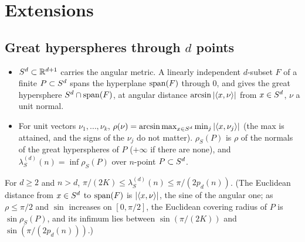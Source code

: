 \documentclass[11pt]{article}
\begin{document}
\section{Extensions}\label{sec:ext}

\subsection{Great hyperspheres through \texorpdfstring{$d$}{d} points}
\label{sec:D-spheres}

\begin{definition}\leavevmode
\begin{itemize}
  \item $S^d\subset\mathbb{R}^{d+1}$ carries the angular metric. A linearly independent $d$-subset $F$ of a
    finite $P\subset S^d$ spans the hyperplane $\operatorname{span}(F)$ through $0$, and gives the great hypersphere
    $S^d\cap\operatorname{span}(F)$, at angular distance $\arcsin\left|\langle x,\nu\rangle\right|$ from $x\in S^d$, $\nu$ a unit normal.
  \item For unit vectors $\nu_1,\dots,\nu_k$, $\rho(\nu)=\arcsin\max_{x\in S^d}\min_j\left|\langle x,\nu_j\rangle\right|$ (the max is
    attained, and the signs of the $\nu_j$ do not matter). $\rho_S(P)$ is $\rho$ of the normals of the great
    hyperspheres of $P$ ($+\infty$ if there are none), and $\lambda_S^{(d)}(n)=\inf\rho_S(P)$ over $n$-point
    $P\subset S^d$.
\end{itemize}
\end{definition}

\begin{proposition}\label{D:spheres}
For $d\ge2$ and $n>d$, $\pi/(2K)\le\lambda_S^{(d)}(n)\le\pi/(2p_d(n))$. (The Euclidean distance from $x\in S^d$ to $\operatorname{span}(F)$ is $\left|\langle x,\nu\rangle\right|$, the sine of the angular one; as
$\rho\le\pi/2$ and $\sin$ increases on $[0,\pi/2]$, the Euclidean covering radius of $P$ is $\sin\rho_S(P)$, and its
infimum lies between $\sin(\pi/(2K))$ and $\sin(\pi/(2p_d(n)))$.)
\end{proposition}
\end{document}
